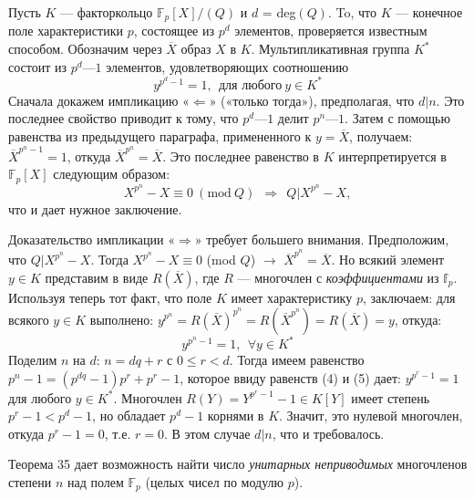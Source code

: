\documentclass{mai_book}
\begin{document}
\setcounter{equation}{3}
\begin{myproof}
Пусть $K$ — факторкольцо $\mathbb{F}_p[X]\slash(Q)$ и $d$ = deg$(Q)$. To, что $K$ — 
конечное поле характеристики $p$, состоящее из $p^d$ элементов,  
проверяется известным способом. Обозначим через $\overline{X}$ образ $X$ в $K$. 
Мультипликативная группа $K^*$ состоит из $p^d — 1$ элементов,  
удовлетворяющих соотношению 
\begin{equation}
y^{p^d - 1} = 1,\:\: \text{для любого}\: y\in K^*
\end{equation}
Сначала докажем импликацию «$\Leftarrow$» («только тогда»), предполагая, 
что $d | n$. Это последнее свойство приводит к тому, что $p^d — 1$ делит 
$p^n — 1$. Затем с помощью равенства из предыдущего параграфа,  
примененного к $y = \overline{X}$, получаем: $\overline{X}^{p^n -1} = 1$, откуда $\overline{X}^{p^n} = \overline{X}$. 
Это последнее равенство в $K$ интерпретируется в $\mathbb{F}_p [X]$ следующим 
образом: 
\begin{equation*}
X^{p^n} - X \equiv 0\: (\text{mod}\: Q)\:\: \Rightarrow\:\: Q|X^{p^n} - X,
\end{equation*}
что и дает нужное заключение.

\noindent Доказательство импликации «$\Rightarrow$» требует большего внимания. 
Предположим, что $Q | X^{p^n} - X$. Тогда $X^{p^n} - X \equiv 0$ (mod $Q$) $\rightarrow$ 
$\overline{X}^{p^n} = \overline{X}$. Но всякий элемент $y\in K$ представим в виде $R(\overline{X})$, где $R$ 
— многочлен с \textit{коэффициентами} из $\mathbb{f}_p$. Используя теперь тот факт, 
что поле $K$ имеет характеристику $p$, заключаем: для всякого $y \in K$ 
выполнено: $y^{p^n} = R(\overline{X})^{p^n} = R(\overline{X}^{p^n}) = R(\overline{X}) = y$, откуда: 
\begin{equation}
y^{p^n - 1} = 1,\:\: \forall y \in K^*
\end{equation}
Поделим $n$ на $d$: $n = dq + r$ с $0\leq r < d$. Тогда имеем равенство
$p^n - 1 = (p^{dq} - 1)p^r + p^r - 1$, которое ввиду равенств (4) и (5) дает:
$y^{p^r - 1} = 1$ для любого $y \in K^*$. Многочлен $R(Y) = Y^{p^r -1} - 1 \in K[Y]$
имеет степень $p^r - 1 < p^d - 1$, но обладает $p^d - 1$ корнями в $K$.
Значит, это нулевой многочлен, откуда $p^r - 1 = 0$, т.е. $r = 0$. В этом
случае $d | n$, что и требовалось.
\end{myproof}

Теорема 35 дает возможность найти число \textit{унитарных неприводимых}
многочленов степени $n$ над полем $\mathbb{F}_p$ (целых чисел по модулю $p$).
 
\end{document}
